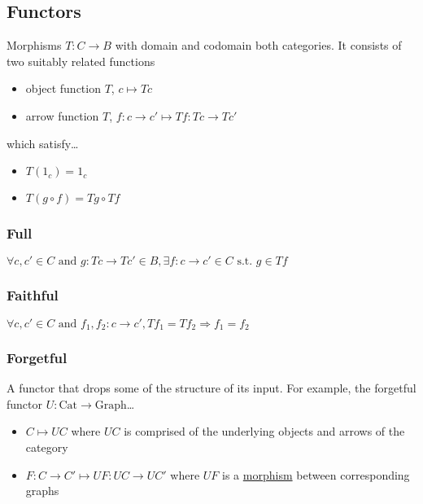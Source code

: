 \subsection{Functors}\label{functor}
Morphisms $T: C \rightarrow B$ with domain and codomain both categories. It consists of two suitably related functions
\begin{itemize}
  \item object function $T$, $c \mapsto Tc$
  \item arrow function $T$, $f:c \rightarrow c' \mapsto Tf:Tc \rightarrow Tc'$
\end{itemize}
which satisfy\dots
\begin{itemize}
  \item $T(1_c) = 1_c$
  \item $T(g \circ f) = Tg \circ Tf$
\end{itemize}

\subsubsection{Full}\label{full}
$\forall c, c' \in C \textrm{ and } g:Tc \rightarrow Tc' \in B, \exists f:c \rightarrow c' \in C \textrm{ s.t. } g \in Tf$

\subsubsection{Faithful}\label{faithful}
$\forall c, c' \in C \textrm { and } f_1,f_2:c \rightarrow c', Tf_1 = Tf_2 \Rightarrow f_1=f_2$

\subsubsection{Forgetful}\label{forgetful}
A functor that drops some of the structure of its input. For example, the forgetful functor $U: \textrm{Cat} \rightarrow \textrm{Graph}$\dots
\begin{itemize}
  \item $C \mapsto UC$ where $UC$ is comprised of the underlying objects and arrows of the category
  \item $F:C \rightarrow C' \mapsto UF:UC \rightarrow UC'$ where $UF$ is a \hyperref[graphisomorphisms]{morphism} between corresponding graphs
\end{itemize}